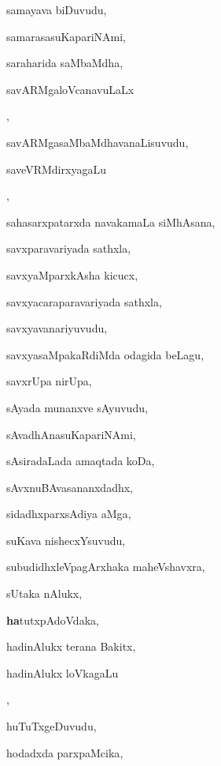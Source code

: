 \begin{multicols}{3}
{\noindent
{samayava biDuvudu}, \pageref{samayava biDuvudu}

\noindent
{samarasasuKapariNAmi}, \pageref{samarasasuKapariNAmi}

\noindent
{saraharida saMbaMdha}, \pageref{saraharida saMbaMdha}

\noindent
{savARMgaloVcanavuLaLx} 

\noindent
{}, \pageref{savARMgaloVcanavuLaLx jaMgama}

\noindent
{savARMgasaMbaMdhavanaLisuvudu}, \pageref{savARMgasaMbaMdhavanaLisuvudu}

\noindent
{saveVRMdirxyagaLu}

\noindent
{}, \pageref{saveVRMdirxyagaLu EkeVMdirxyavAguvudu}

\noindent
{sahasarxpatarxda navakamaLa siMhAsana}, \pageref{sahasarxpatarxda navakamaLa siMhAsana}

\noindent
{savxparavariyada sathxla}, \pageref{savxparavariyada sathxla}

\noindent
{savxyaMparxkAsha kicucx}, \pageref{savxyaMparxkAsha kicucx}

\noindent
{savxyacaraparavariyada sathxla}, \pageref{savxyacaraparavariyada sathxla}

\noindent
{savxyavanariyuvudu}, \pageref{savxyavanariyuvudu}

\noindent
{savxyasaMpakaRdiMda odagida beLagu}, \pageref{savxyasaMpakaRdiMda odagida beLagu}

\noindent
{savxrUpa nirUpa}, \pageref{savxrUpa nirUpa}

\noindent
{sAyada munanxve sAyuvudu}, \pageref{sAyada munanxve sAyuvudu}

\noindent
{sAvadhAnasuKapariNAmi}, \pageref{sAvadhAnasuKapariNAmi}

\noindent
{sAsiradaLada amaqtada koDa}, \pageref{sAsiradaLada amaqtada koDa}

\noindent
{sAvxnuBAvasananxdadhx}, \pageref{sAvxnuBAvasananxdadhx}

\noindent
{sidadhxparxsAdiya aMga}, \pageref{sidadhxparxsAdiya aMga}

\noindent
{suKava nishecxYsuvudu}, \pageref{suKava nishecxYsuvudu}

\noindent
{subudidhxleVpagArxhaka maheVshavxra}, \pageref{subudidhxleVpagArxhaka maheVshavxra}

\noindent
{sUtaka nAlukx}, \pageref{sUtaka nAlukx}

\noindent
{{\large\textbf{ha}}tutxpAdoVdaka}, \pageref{hatutxpAdoVdaka}

\noindent
{hadinAlukx terana Bakitx}, \pageref{hadinAlukx terana Bakitx}

\noindent
{hadinAlukx loVkagaLu} 

\noindent
{}, \pageref{hadinAlukx loVkagaLu (IreVLu loVka)}

\noindent
{huTuTxgeDuvudu}, \pageref{huTuTxgeDuvudu}

\noindent
{hodadxda parxpaMcika}, \pageref{hodadxda parxpaMcika}
}
\end{multicols}
